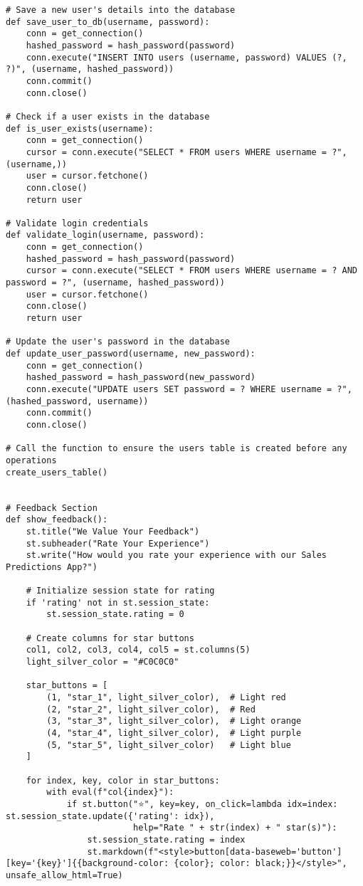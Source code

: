 \documentclass[10pt]{report}
\begin{document}
\begin{center}
\begin{lstlisting}
# Save a new user's details into the database
def save_user_to_db(username, password):
    conn = get_connection()
    hashed_password = hash_password(password)
    conn.execute("INSERT INTO users (username, password) VALUES (?, ?)", (username, hashed_password))
    conn.commit()
    conn.close() 

# Check if a user exists in the database
def is_user_exists(username):
    conn = get_connection()
    cursor = conn.execute("SELECT * FROM users WHERE username = ?", (username,))
    user = cursor.fetchone()
    conn.close()
    return user

# Validate login credentials
def validate_login(username, password):
    conn = get_connection()
    hashed_password = hash_password(password)
    cursor = conn.execute("SELECT * FROM users WHERE username = ? AND password = ?", (username, hashed_password))
    user = cursor.fetchone()
    conn.close()
    return user

# Update the user's password in the database
def update_user_password(username, new_password):
    conn = get_connection()
    hashed_password = hash_password(new_password)
    conn.execute("UPDATE users SET password = ? WHERE username = ?", (hashed_password, username))
    conn.commit()
    conn.close()

# Call the function to ensure the users table is created before any operations
create_users_table()


# Feedback Section
def show_feedback():
    st.title("We Value Your Feedback")
    st.subheader("Rate Your Experience")
    st.write("How would you rate your experience with our Sales Predictions App?")

    # Initialize session state for rating
    if 'rating' not in st.session_state:
        st.session_state.rating = 0

    # Create columns for star buttons
    col1, col2, col3, col4, col5 = st.columns(5)
    light_silver_color = "#C0C0C0"
    
    star_buttons = [
        (1, "star_1", light_silver_color),  # Light red
        (2, "star_2", light_silver_color),  # Red
        (3, "star_3", light_silver_color),  # Light orange
        (4, "star_4", light_silver_color),  # Light purple
        (5, "star_5", light_silver_color)   # Light blue
    ]

    for index, key, color in star_buttons:
        with eval(f"col{index}"):
            if st.button("⭐", key=key, on_click=lambda idx=index: st.session_state.update({'rating': idx}), 
                         help="Rate " + str(index) + " star(s)"):
                st.session_state.rating = index
                st.markdown(f"<style>button[data-baseweb='button'][key='{key}']{{background-color: {color}; color: black;}}</style>", unsafe_allow_html=True)


\end{lstlisting}
\end{center}
\end{document}
